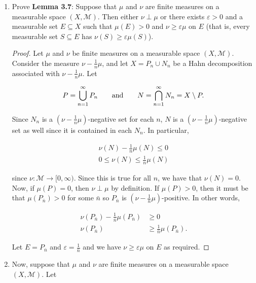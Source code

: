 \documentclass[11pt,oneside,english]{amsart}
\theoremstyle{definition}
\newcommand{\aspace}{\hspace{7mm}\text{and}\hspace{7mm}}
\newcommand{\ve}{\varepsilon}
\newcommand{\MC}[1]{\mathcal{#1}}
\begin{document}
\rightline{\today}



\vspace{5mm}
\begin{enumerate}


\item Prove \textbf{Lemma 3.7}: Suppose that $\mu$ and $\nu$ are finite measures on a measurable space $(X,\MC{M})$.  Then either $\nu \perp \mu$ or there exists $\ve > 0$ and a measurable set $E \subseteq X$ such that $\mu(E) > 0$ and $\nu \geq \ve \mu$ on $E$ (that is, every measurable set $S \subseteq E$ has $\nu(S) \geq \ve \mu(S)$).

\begin{proof}
Let $\mu$ and $\nu$ be finite measures on a measurable space $(X,\MC{M})$. Consider the measure $\nu-\frac{1}{n}\mu$, and let $X=P_n\cup N_n$ be a Hahn decomposition associated with $\nu-\frac{1}{n}\mu$. Let

\[
P=\bigcup_{n=1}^\infty P_n\aspace N=\bigcap_{n=1}^\infty N_n=X\setminus P.
\]

Since $N_n$ is a $(\nu-\frac{1}{n}\mu)$-negative set for each $n$, $N$ is a $(\nu-\frac{1}{n}\mu)$-negative set as well since it is contained in each $N_n$. In particular,

\begin{align*}
\nu(N)-\frac{1}{n}\mu(N)\leq 0\\[2mm]
0\leq\nu(N)\leq\frac{1}{n}\mu(N)
\end{align*}

since $\nu:\MC{M}\rightarrow[0,\infty)$. Since this is true for all $n$, we have that $\nu(N)=0$. Now, if $\mu(P)=0$, then $\nu\perp\mu$ by definition. If $\mu(P)>0$, then it must be that $\mu(P_{\bar{n}})>0$ for some ${\bar{n}}$ so $P_{\bar{n}}$ is $(\nu-\frac{1}{{\bar{n}}}\mu)$-positive. In other words,

\begin{align*}
\nu(P_{\bar{n}})-\frac{1}{{\bar{n}}}\mu(P_{\bar{n}})&\geq0\\[2mm]
\nu(P_{\bar{n}})&\geq\frac{1}{{\bar{n}}}\mu(P_{\bar{n}}).
\end{align*}

Let $E=P_{\bar{n}}$ and $\ve=\frac{1}{{\bar{n}}}$ and we have $\nu\geq\ve\mu$ on $E$ as required.
\end{proof}

\pagebreak

\item Now, suppose that $\mu$ and $\nu$ are finite measures on a measurable space $(X,\MC{M})$. Let 


\end{enumerate}
\end{document}
